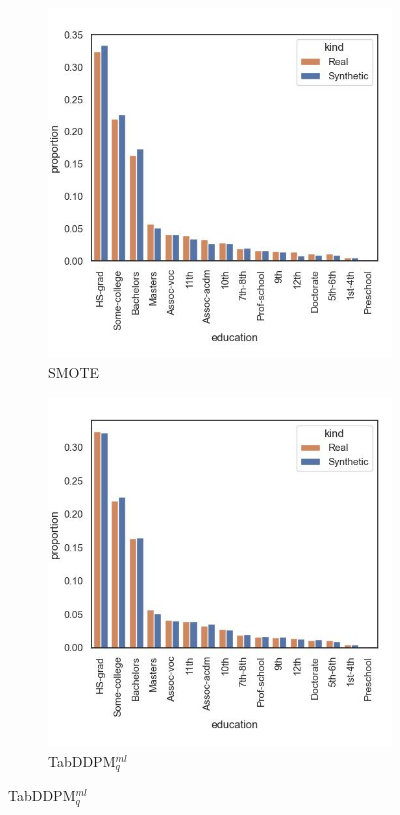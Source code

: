 \begin{figure}[t]
	\begin{subfigure}{0.32\textwidth}
		\centering
		\includegraphics[width=\textwidth]{images/dist_education/SMOTE.jpg}
		\caption{SMOTE}
	\end{subfigure}
	\begin{subfigure}{0.32\textwidth}
		\centering
		\includegraphics[width=\textwidth]{images/dist_education/tab-ddpm.jpg}
		\caption{TabDDPM$^{ml}_q$}
	\end{subfigure}  



\end{figure}

